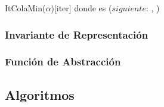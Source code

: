 		\begin{Estructura}{ItColaMin($\alpha$)}[iter]
			\- \- \- \- donde  es ($siguiente$: ,
			)

		\subsubsection{Invariante de Representación}

		\renewcommand{\labelenumi}{(\Roman{enumi})}




	\subsubsection{Función de Abstracción}



\subsection{Algoritmos}
	\lstset{style=alg}


\end{Estructura}
